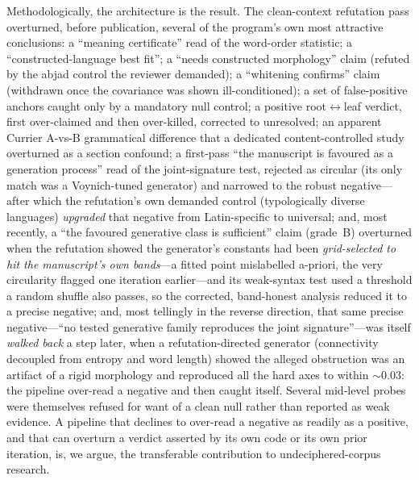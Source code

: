\documentclass[11pt]{article}
\begin{document}
Methodologically, the architecture is the result. The clean-context refutation pass
overturned, before publication, several of the program's own most attractive
conclusions: a ``meaning certificate'' read of the word-order statistic; a
``constructed-language best fit''; a ``needs constructed morphology'' claim (refuted by
the abjad control the reviewer demanded); a ``whitening confirms'' claim (withdrawn
once the covariance was shown ill-conditioned); a set of false-positive anchors caught
only by a mandatory null control; a positive root$\leftrightarrow$leaf verdict, first
over-claimed and then over-killed, corrected to unresolved; an apparent Currier
A-vs-B grammatical difference that a dedicated content-controlled study overturned as a
section confound; a first-pass ``the manuscript is favoured as a
generation process'' read of the joint-signature test, rejected as circular (its only
match was a Voynich-tuned generator) and narrowed to the robust negative---after which
the refutation's own demanded control (typologically diverse languages) \emph{upgraded}
that negative from Latin-specific to universal; and, most recently, a ``the favoured
generative class is sufficient'' claim (grade~B) overturned when the refutation showed the
generator's constants had been \emph{grid-selected to hit the manuscript's own bands}---a
fitted point mislabelled a-priori, the very circularity flagged one iteration earlier---and
its weak-syntax test used a threshold a random shuffle also passes, so the corrected,
band-honest analysis reduced it to a precise negative; and, most tellingly in the reverse
direction, that same precise negative---``no tested generative family reproduces the joint
signature''---was itself \emph{walked back} a step later, when a refutation-directed
generator (connectivity decoupled from entropy and word length) showed the alleged
obstruction was an artifact of a rigid morphology and reproduced all the hard axes to within
$\sim\!0.03$: the pipeline over-read a negative and then caught itself. Several mid-level
probes were themselves refused for want of a clean null rather than reported as weak
evidence. A pipeline that declines to over-read a negative as readily as a positive, and
that can overturn a
verdict asserted by its own code or its own prior iteration, is, we argue, the
transferable contribution to undeciphered-corpus research.
\end{document}
